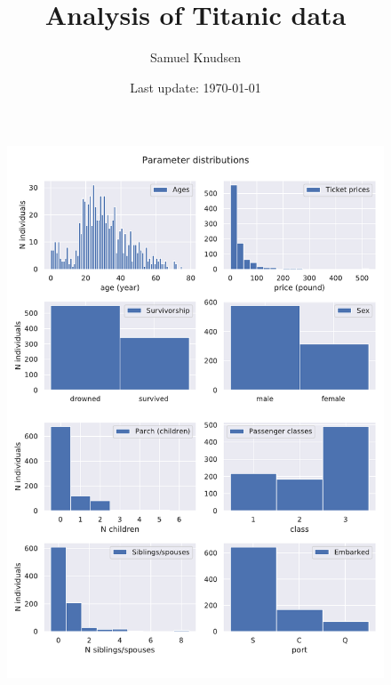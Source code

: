\documentclass{book}
\title{Analysis of Titanic data}
\author{Samuel Knudsen} %
\date{Last update: \today}
\begin{document}
\maketitle



\begin{figure}
    \centering
    \includegraphics[scale=0.67]{../figs/distributions.pdf}%
\end{figure}
\end{document}

